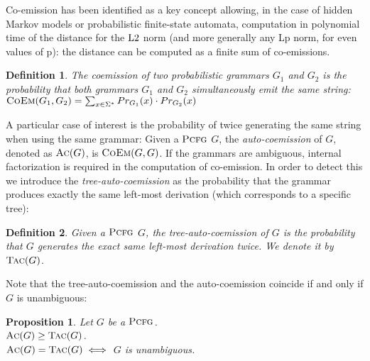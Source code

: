 \documentclass[submission]{eptcs} \usepackage{breakurl}             \usepackage[english]{babel}
\newtheorem{definition}{Definition}
\newtheorem{proposition}{Proposition}
\providecommand{\Ltwo}{\textup{L2}}
\providecommand{\PCFG}{\ensuremath{\textsc{Pcfg}}}
\providecommand{\AC}{\ensuremath{\textsc{Ac}}}
\providecommand{\TAC}{\ensuremath{\textsc{Tac}}}
\providecommand{\Prob}{\ensuremath{Pr}}
\providecommand{\COEM}{\ensuremath{\textsc{CoEm}}}
\begin{document}
Co-emission has been identified as a key concept allowing, in the case of hidden Markov models or probabilistic finite-state automata, computation in polynomial time of the distance for the $\Ltwo$ norm (and more generally any Lp norm, for even values of p): the distance can be computed as a finite sum of co-emissions.
\begin{definition}
The coemission of two probabilistic grammars $G_1$ and $G_2$ is the probability that both grammars $G_1$ and $G_2$ simultaneously emit the same string:\\
$\COEM(G_1,G_2)=\sum_{x\in\Sigma^*}\Prob_{G_1}(x)\cdot\Prob_{G_2}(x)$
\end{definition}
A particular case of interest is the probability of twice generating the same string when using the same grammar:
Given a $\PCFG$ $G$, the \emph{auto-coemission} of $G$, denoted as $\AC(G)$, is $\COEM(G,G)$. 
If the grammars are ambiguous, internal factorization is required in the computation of co-emission. In order to detect this we introduce the \emph{tree-auto-coemission} as the probability that the grammar produces exactly the same left-most derivation (which corresponds to a specific tree):
\begin{definition}
Given a $\PCFG$ $G$, the \emph{tree-auto-coemission} of $G$ is the probability that $G$ generates the exact same left-most derivation twice. We denote it by $\TAC(G)$.
\end{definition}
Note that the tree-auto-coemission and the auto-coemission coincide if and only if $G$ is unambiguous:
\begin{proposition}\label{ambiguity}
Let $G$ be a $\PCFG$.\\
$\AC(G)\ge\TAC(G)$.\\
$\AC(G)=\TAC(G)\iff $ $G$ is unambiguous.
\end{proposition}
\end{document}

